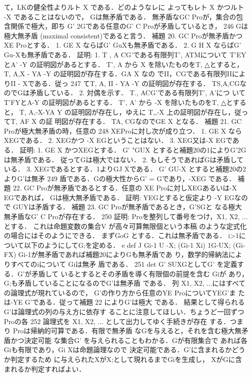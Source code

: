 \documentclass{ltjsarticle}
\theoremstyle{mystyle1}
\theoremstyle{mystyle2}
\begin{document}
て，LKの健全性よりルト X である．どのようなレに よってもレト X かつルト -X であることはないので， Gは無矛盾である．
無矛盾なGC Proが，集合の包含関係で極大，即ち G' 2Gである任意のG' C Proが矛盾しているとき，
246
Gは極大無矛盾 (maximal consistent)であると言う．
補題 20. GC Proが無矛盾かつ XE Proとする． 1. GE X ならばG' Gu{X}も無矛盾である． 2. G H X ならばG' Gu{-X}も無矛盾である．
証明: 1. T , A CG'である有限列T', ATMについて T'EYとA' -Y の証明図があるとする． T', A から X を除いたものをT, △とすると， T, A,X - YA -Y の証明図が存在する．GA X なの でII，CGである有限列IIによりII - Xである．従っ
247
てT, A, II - YA -Y の証明図が存在する． TS,A,CGなのでGは矛盾している． 2. 対偶を示す． T., ACG'である有限列T', A'につ いてT'FYとA-Y の証明図があるとする． T', A' から -X を除いたものをT, △とすると， T, A,-X-YA Y の証明図が存在し，ゆえに T,,-X 上の証明図が存在し，従ってT, AF X の証 明図が存在する． TA, CGなのでGE X となる．
補題 21. GC Proが極大無矛盾の時，任意の
248
XEProに対し次が成り立つ． 1. GE X ならXEGである． 2. XEGかつ -X EGということはない． 3. XEG又は-X EGである．
証明: 1. GE X かつXEGとする． G' "GU{X} とすると補題20の1によりG'2Gは無矛盾である． 従ってGは極大ではない． 2. もしそうであればGは矛盾している． 3. XEGであるとする．1よりGJ Xである． G' GU{-X} とすると補題20の2よりG'は無矛
249
盾である．Gの極大性からG' = Gであり，-XEG である．
補題 22. GC Proが無矛盾であるとする．任意の XE Proに対しXEGあるいは-X EGであれば， Gは極大無矛盾である．
証明: YEGとすると仮定より -Y EGなので GU{Y}は矛盾する．
補題 23. GC Proが無矛盾であるとき，G'SGと なる極大無矛盾なG' C Proが存在する．
250
証明: Proを整列して番号をつけ，X1, X2, ...とする． これは命題変数の集合V が高々可算無限個という本稿 のような定式化の場合にはそのようにできる． まずGoG とする．これは無矛盾である． i>1について以下のようにしてG;を定める．
e def J Gi-1 U {-X;} (Gi-1 Xi)
1G-U{X;} (Gi-FX)
Gi-1が無矛盾であれば補題20によりGも無矛盾であ り，数学的帰納法によりすべてのiについて Giは無矛 盾である．
251
det
G' SUXGとしてG' を定義する．G'が矛盾して いるとするとその矛盾を導く有限個の前提を含む Giが あり，G;も矛盾していることになるのでG'は無矛盾 である． 列 X1, X2, ...にはすべての論理式が現れているので， G'の作り方から任意のYE ProについてYEG'ま たは-YE G'である．従って補題 22 によりG'は極大 である．
結果として得られるG'は論理式の列の与え方に依存す ることに注意してほしい．ちょうど一回ずつProの各
252
論理式を X1, X2, ... として出力してゆく手続きが存在 する．つまり Proは帰納的可算である．有限で無矛盾 なGを与えると，それを含む極大無矛盾かつ決定可能 な集合G' を与えられることもわかる．Gが有限集合で あれば各Giも有限であり，Gi Xは命題論理なので 決定可能である．G'に含まれるかどうか判定するため に与えられたXがX;として現れるまでGiを生成し， XがGに含まれるか判定すればよい．
\end{document}
